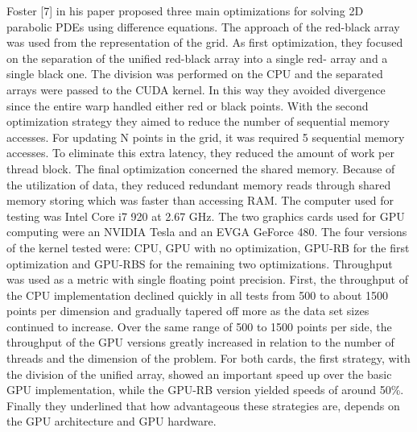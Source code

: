Foster [7] in his paper proposed three main optimizations for solving 2D parabolic PDEs using difference equations. The approach of the red-black array was used from the representation of the grid. As first optimization, they focused on the separation of the unified red-black array into a single red- array and a single black one. The division was performed on the CPU and the separated arrays were passed to the CUDA kernel. In this way they avoided divergence since the entire warp handled either red or black points. With the second optimization strategy they aimed to reduce the number of sequential memory accesses. For updating N points in the grid, it was required 5 sequential memory accesses. To eliminate this extra latency, they reduced the amount of work per thread block. The final optimization concerned the shared memory. Because of the utilization of data, they reduced redundant memory reads through shared memory storing which was faster than accessing RAM. The computer used for testing was Intel Core i7 920 at 2.67 GHz. The two graphics cards used for GPU computing were an NVIDIA Tesla and an EVGA GeForce 480. The four versions of the kernel tested were: CPU, GPU with no optimization, GPU-RB for the first optimization and GPU-RBS for the remaining two optimizations. Throughput was used as a metric with single floating point precision. First, the throughput of the CPU implementation declined quickly in all tests from 500 to about 1500 points per dimension and gradually tapered off more as the data set sizes continued to increase. Over the same range of 500 to 1500 points per side, the throughput of the GPU versions greatly increased in relation to the number of threads and the dimension of the problem. For both cards, the first strategy, with the division of the unified array, showed an important speed up over the basic GPU implementation, while the GPU-RB version yielded speeds of around 50\%. Finally they underlined that how advantageous these strategies are, depends on the GPU architecture and GPU hardware.

